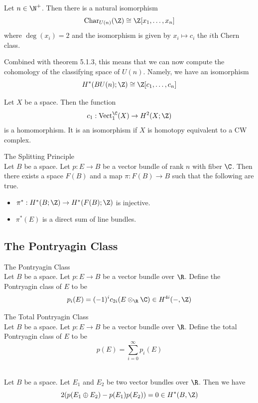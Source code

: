 \documentclass[a4paper]{article}
\begin{document}
\begin{prp}{}{}
Let $n\in\N^+$. Then there is a natural isomorphism $$\text{Char}_{U(n)}(\Z)\cong\Z[x_1,\dots,x_n]$$ where $\deg(x_i)=2$ and the isomorphism is given by $x_i\mapsto c_i$ the $i$th Chern class. 
\end{prp}

Combined with theorem 5.1.3, this means that we can now compute the cohomology of the  classifying space of $U(n)$. Namely, we have an isomorphism $$H^\ast(BU(n);\Z)\cong\Z[c_1,\dots,c_n]$$

\begin{prp}{}{} Let $X$ be a space. Then the function $$c_1:\text{Vect}_1^\C(X)\to H^2(X;\Z)$$ is a homomorphism. It is an isomorphism if $X$ is homotopy equivalent to a CW complex. 
\end{prp}

\begin{thm}{The Splitting Principle}{}\\
Let $B$ be a space. Let $p:E\to B$ be a vector bundle of rank $n$ with fiber $\C$. Then there exists a space $F(B)$ and a map $\pi:F(B)\to B$ such that the following are true. 
\begin{itemize}
\item $\pi^\ast:H^\ast(B;\Z)\to H^\ast(F(B);\Z)$ is injective. 
\item $\pi^\ast(E)$ is a direct sum of line bundles. 
\end{itemize}
\end{thm}

\subsection{The Pontryagin Class}
\begin{defn}{The Pontryagin Class}{}\\
Let $B$ be a space. Let $p:E\to B$ be a vector bundle over $\R$. Define the Pontryagin class of $E$ to be $$p_i(E)=(-1)^ic_{2i}(E\otimes_\R\C)\in H^{4i}(-,\Z)$$
\end{defn}

\begin{defn}{The Total Pontryagin Class}{}\\
Let $B$ be a space. Let $p:E\to B$ be a vector bundle over $\R$. Define the total Pontryagin class of $E$ to be $$p(E)=\sum_{i=0}^\infty p_i(E)$$
\end{defn}

\begin{prp}{}{}\\
Let $B$ be a space. Let $E_1$ and $E_2$ be two vector bundles over $\R$. Then we have $$2(p(E_1\oplus E_2)-p(E_1)p(E_2))=0\in H^\ast(B,\Z)$$
\end{prp}
\end{document}
